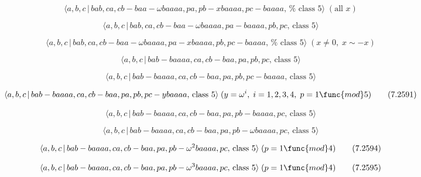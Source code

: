 \documentclass[10pt]{article}
\begin{document}
\begin{equation}
\langle a,b,c\,|\,bab,ca,cb-baa-\omega baaaa,pa,pb-xbaaaa,pc-baaaa,\,\text{%
class }5\rangle \;(\text{all }x)  \tag{7.2586}
\end{equation}

\begin{equation}
\langle a,b,c\,|\,bab,ca,cb-baa-\omega baaaa,pa-baaaa,pb,pc,\,\text{class }%
5\rangle  \tag{7.2587}
\end{equation}

\begin{equation}
\langle a,b,c\,|\,bab,ca,cb-baa-\omega baaaa,pa-xbaaaa,pb,pc-baaaa,\,\text{%
class }5\rangle \;(x\neq 0,\;x\sim -x)  \tag{7.2588}
\end{equation}

\begin{equation}
\langle a,b,c\,|\,bab-baaaa,ca,cb-baa,pa,pb,pc,\,\text{class }5\rangle 
\tag{7.2589}
\end{equation}

\begin{equation}
\langle a,b,c\,|\,bab-baaaa,ca,cb-baa,pa,pb,pc-baaaa,\,\text{class }5\rangle
\tag{7.2590}
\end{equation}

\begin{equation}
\langle a,b,c\,|\,bab-baaaa,ca,cb-baa,pa,pb,pc-ybaaaa,\,\text{class }%
5\rangle \;(y=\omega ^{i},\;i=1,2,3,4,\;p=1\func{mod}5)  \tag{7.2591}
\end{equation}

\begin{equation}
\langle a,b,c\,|\,bab-baaaa,ca,cb-baa,pa,pb-baaaa,pc,\,\text{class }5\rangle
\tag{7.2592}
\end{equation}

\begin{equation}
\langle a,b,c\,|\,bab-baaaa,ca,cb-baa,pa,pb-\omega baaaa,pc,\,\text{class }%
5\rangle  \tag{7.2593}
\end{equation}

\begin{equation}
\langle a,b,c\,|\,bab-baaaa,ca,cb-baa,pa,pb-\omega ^{2}baaaa,pc,\,\text{%
class }5\rangle \;(p=1\func{mod}4)  \tag{7.2594}
\end{equation}

\begin{equation}
\langle a,b,c\,|\,bab-baaaa,ca,cb-baa,pa,pb-\omega ^{3}baaaa,pc,\,\text{%
class }5\rangle \;(p=1\func{mod}4)  \tag{7.2595}
\end{equation}
\end{document}
